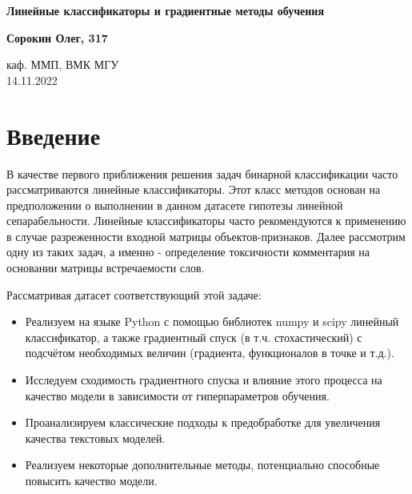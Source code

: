 \documentclass{article}
\begin{document}
\begin{titlepage}
    \begin{center}
        \vspace*{5cm}

        \textbf{Линейные классификаторы и градиентные методы обучения}
    
        \vspace{0.5cm}
 
        \textbf{Сорокин Олег, 317}
 
        \vfill
             
        \vspace{0.8cm}
      
             
        каф. ММП, ВМК МГУ\\
        14.11.2022
             
    \end{center}
 \end{titlepage}

\newpage
\tableofcontents{}
\newpage

\section{Введение}
    В качестве первого приближения решения задач бинарной классификации часто рассматриваются линейные классификаторы. Этот класс методов основан на предположении о выполнении в данном датасете гипотезы линейной сепарабельности. Линейные классификаторы часто рекомендуются к применению в случае разреженности входной матрицы объектов-признаков. Далее рассмотрим одну из таких задач, а именно - определение токсичности комментария на основании матрицы встречаемости слов.

    Рассматривая датасет соответствующий этой задаче:
    \begin{itemize}
        \item Реализуем на языке Python с помощью библиотек numpy и scipy линейный классификатор, а также градиентный спуск (в т.ч. стохастический) с подсчётом необходимых величин (градиента, функционалов в точке и т.д.).
        \item Исследуем сходимость градиентного спуска и влияние этого процесса на качество модели в зависимости от гиперпараметров обучения.
        \item Проанализируем классические подходы к предобработке для увеличения качества текстовых моделей.
        \item Реализуем некоторые дополнительные методы, потенциально способные повысить качество модели.
    \end{itemize}
\end{document}
